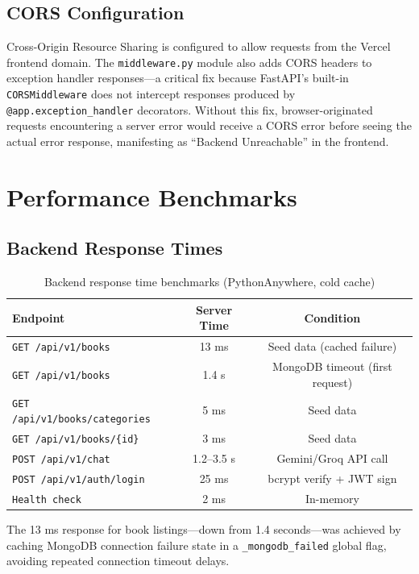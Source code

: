 \documentclass[11pt,a4paper]{article}
\begin{document}
\subsection{CORS Configuration}

Cross-Origin Resource Sharing is configured to allow requests from the Vercel frontend domain. The \texttt{middleware.py} module also adds CORS headers to exception handler responses---a critical fix because FastAPI's built-in \texttt{CORSMiddleware} does not intercept responses produced by \texttt{@app.exception\_handler} decorators. Without this fix, browser-originated requests encountering a server error would receive a CORS error before seeing the actual error response, manifesting as ``Backend Unreachable'' in the frontend.
\clearpage

\section{Performance Benchmarks}

\subsection{Backend Response Times}

\begin{table}[H]
\centering
\begin{tabular}{@{}lcc@{}}
\toprule
\textbf{Endpoint} & \textbf{Server Time} & \textbf{Condition} \\
\midrule
\texttt{GET /api/v1/books} & 13 ms & Seed data (cached failure) \\
\texttt{GET /api/v1/books} & 1.4 s & MongoDB timeout (first request) \\
\texttt{GET /api/v1/books/categories} & 5 ms & Seed data \\
\texttt{GET /api/v1/books/\{id\}} & 3 ms & Seed data \\
\texttt{POST /api/v1/chat} & 1.2--3.5 s & Gemini/Groq API call \\
\texttt{POST /api/v1/auth/login} & 25 ms & bcrypt verify + JWT sign \\
\texttt{Health check} & 2 ms & In-memory \\
\bottomrule
\end{tabular}
\caption{Backend response time benchmarks (PythonAnywhere, cold cache)}
\end{table}

The 13 ms response for book listings---down from 1.4 seconds---was achieved by caching MongoDB connection failure state in a \texttt{\_mongodb\_failed} global flag, avoiding repeated connection timeout delays.
\end{document}
